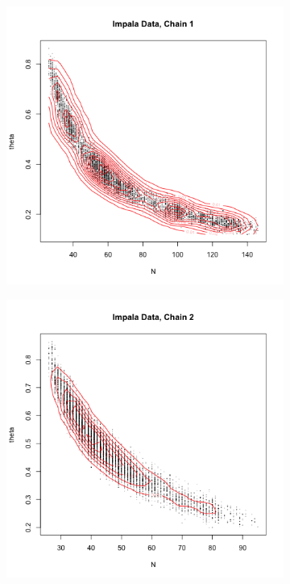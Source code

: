 \documentclass[10pt,psamsfonts]{amsart}
\theoremstyle{definition}
\theoremstyle{remark}
\numberwithin{equation}{section}
\begin{document}
\begin{figure}
		\begin{subfigure}[b]{0.3\textwidth}
			\includegraphics[width=\textwidth]{wonlee_mcmc_impala_1.png}
		\end{subfigure}
	\begin{subfigure}[b]{0.3\textwidth}
		\includegraphics[width=\textwidth]{wonlee_mcmc_impala_2.png}

\end{subfigure}
\end{figure}
\end{document}

